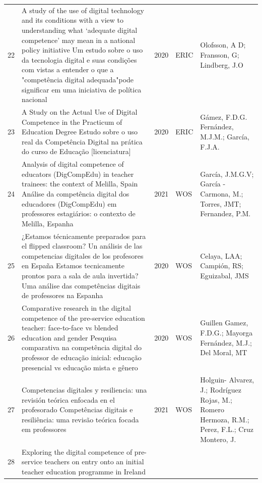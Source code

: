 \documentclass[portuguese]{textolivre}
\begin{document}
\begin{footnotesize}
\begin{longtable}{
    @{}l >{\raggedright\arraybackslash}p{}
    ll
    >{\raggedright\arraybackslash}p{}@{}
    }
22 & A study of the use of digital technology and its conditions with a view to understanding what ‘adequate digital competence’ may mean in a national policy initiative \newline
Um estudo sobre o uso da tecnologia digital e suas condições com vistas a entender o que a "competência digital adequada"pode significar em uma iniciativa de política nacional & 2020 & ERIC & Olofsson, A D; Fransson, G; Lindberg, J.O \\
23 & A Study on the Actual Use of Digital Competence in the Practicum of Education Degree \newline
Estudo sobre o uso real da Competência Digital na prática do curso de Educação [licenciatura] & 2020 & ERIC & Gámez, F.D.G. Fernández, M.J.M.; García, F.J.A. \\
24 & Analysis of digital competence of educators (DigCompEdu) in teacher trainees: the context of Melilla, Spain \newline
Análise da competência digital dos educadores (DigCompEdu) em professores estagiários: o contexto de Melilla, Espanha & 2021 & WOS & García, J.M.G.V; García -Carmona, M.; Torres, JMT; Fernandez, P.M. \\
25 & ¿Estamos técnicamente preparados para el flipped classroom? Un análisis de las competencias digitales de los profesores en España \newline
Estamos tecnicamente prontos para a sala de aula invertida? Uma análise das competências digitais de professores na Espanha & 2020 & WOS & Celaya, LAA; Campión, RS; Eguizabal, JMS \\
26 & Comparative research in the digital competence of the pre-service education teacher: face-to-face vs blended education and gender \newline
Pesquisa comparativa na competência digital do professor de educação inicial: educação presencial vs educação mista e gênero & 2020 & WOS	& Guillen Gamez, F.D.G.; Mayorga Fernández, M.J.; Del Moral, MT \\
27 & Competencias digitales y resiliencia: una revisión teórica enfocada en el profesorado \newline
Competências digitais e resiliência: uma revisão teórica focada em professores & 2021 & WOS & Holguin- Alvarez, J.; Rodríguez Rojas, M.; Romero Hermoza, R.M.; Perez, F.L.; Cruz Montero, J. \\
28 & Exploring the digital competence of pre-service teachers on entry onto an initial teacher education programme in Ireland \newline

\end{longtable}
\end{footnotesize}
\end{document}
